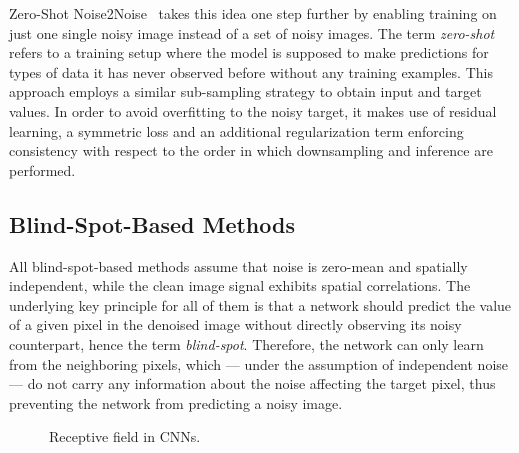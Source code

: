 Zero-Shot Noise2Noise~\cite{ZS-N2N} takes this idea one step further by enabling training on just one single noisy image instead of a set of noisy images.
The term \textit{zero-shot} refers to a training setup where the model is supposed to make predictions for types of data it has never observed before without any training examples.
This approach employs a similar sub-sampling strategy to obtain input and target values.
In order to avoid overfitting to the noisy target, it makes use of residual learning, a symmetric loss and an additional regularization term enforcing consistency with respect to the order in which downsampling and inference are performed.

\subsection{Blind-Spot-Based Methods}

All blind-spot-based methods assume that noise is zero-mean and spatially independent, while the clean image signal exhibits spatial correlations.
The underlying key principle for all of them is that a network should predict the value of a given pixel in the denoised image without directly observing its noisy counterpart, hence the term \textit{blind-spot}.
Therefore, the network can only learn from the neighboring pixels, which --- under the assumption of independent noise --- do not carry any information about the noise affecting the target pixel, thus preventing the network from predicting a noisy image.

\begin{wrapfigure}{r}{0.48\textwidth}
    \centering
    \def\a{5}
    \caption{Receptive field in CNNs.}
    \label{fig:receptive-field}
\end{wrapfigure}

